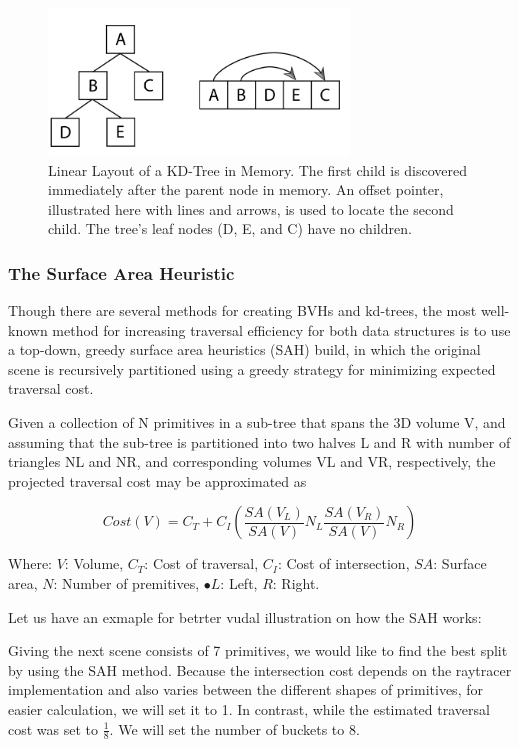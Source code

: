 \documentclass[11pt,a4paper]{article}
\begin{document}
\begin{figure}[h]	
     \centering
     \captionsetup{justification=centering,margin=2cm}
     \includegraphics[width=8cm]{images/kdtree/compact.png}
     \caption{Linear Layout of a KD-Tree in Memory. The  first child is discovered immediately after the parent node in memory. An offset pointer, illustrated here with lines and arrows, is used to locate the second child. The tree's leaf nodes (D, E, and C) have no children.\protect\cite{Pharr2016}}
        \label{fig:dice}
\end{figure}


\subsubsection{The Surface Area Heuristic}
Though there are several methods for creating BVHs and kd-trees, the most well-known method for increasing traversal efficiency for both data structures is to use a top-down, greedy surface area heuristics (SAH) build, in which the original scene is recursively partitioned using a greedy strategy for minimizing expected traversal cost. 
\\
\noindent

Given a collection of N primitives in a sub-tree that spans the 3D volume V, and assuming that the sub-tree is partitioned into two halves L and R with number of triangles NL and NR, and corresponding volumes VL and VR, respectively, the projected traversal cost may be approximated as

\begin{equation}
Cost(V) = C_T + C_I(\frac{SA(V_L)}{SA(V)}N_L \frac{SA(V_R)}{SA(V)}N_R)
\end{equation}

Where: $V$: Volume, $C_T$: Cost of traversal, $C_I$: Cost of intersection, $SA$: Surface area, $N$: Number of premitives, $•L$: Left, $R$: Right.
\\
\noindent

Let us have an exmaple for betrter vudal illustration on how the SAH works: 

Giving the next scene consists of 7 primitives, we would like to find the best split by using the SAH method. Because the intersection cost depends on the raytracer implementation and also varies between the different shapes of primitives, for easier calculation, we will set it to 1. In contrast, while the estimated traversal cost was set to $\frac{1}{8}$. We will set the number of buckets to 8.
\\
\noindent
\end{document}
